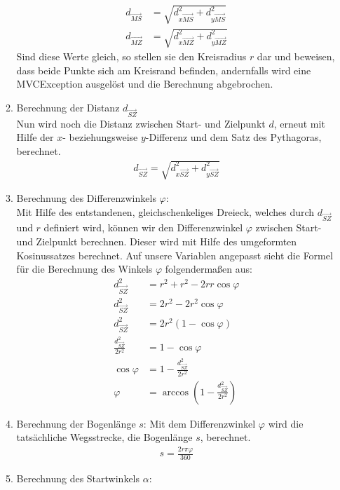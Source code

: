 \begin{itemize}
\begin{enumerate}
\begin{align*}
d_{\overrightarrow{MS}} & = \sqrt{d_{x\overrightarrow{MS}}^2 + d_{y\overrightarrow{MS}}^2}\\
d_{\overrightarrow{MZ}} & = \sqrt{d_{x\overrightarrow{MZ}}^2 + d_{y\overrightarrow{MZ}}^2}
\end{align*}
Sind diese Werte gleich, so stellen sie den Kreisradius $r$ dar und beweisen, dass beide Punkte sich am Kreisrand befinden, andernfalls wird eine MVCException ausgelöst und die Berechnung abgebrochen. 
\item Berechnung der Distanz $d_{\overrightarrow{SZ}}$\\
Nun wird noch die Distanz zwischen Start- und Zielpunkt $d$, erneut mit Hilfe der $x$- beziehungsweise $y$-Differenz und dem Satz des Pythagoras, berechnet.
\begin{align*}
d_{\overrightarrow{SZ}} = \sqrt{d_{x\overrightarrow{SZ}}^2 + d_{y\overrightarrow{SZ}}^2}
\end{align*}
\item Berechnung des Differenzwinkels $\varphi$:\\
Mit Hilfe des entstandenen, gleichschenkeliges Dreieck, welches durch $d_{\overrightarrow{SZ}}$ und $r$ definiert wird, können wir den Differenzwinkel $\varphi$ zwischen Start- und Zielpunkt berechnen. Dieser wird mit Hilfe des umgeformten Kosinussatzes berechnet. Auf unsere Variablen angepasst sieht die Formel für die Berechnung des Winkels $\varphi$ folgendermaßen aus:
\begin{align*}
d_{\overrightarrow{SZ}}^2 & = r^2 + r^2 - 2rr \cos \varphi \\
d_{\overrightarrow{SZ}}^2 & = 2r^2 - 2r^2 \cos \varphi \\
d_{\overrightarrow{SZ}}^2 & = 2r^2(1 - \cos \varphi) \\
\frac{d_{\overrightarrow{SZ}}^2}{2r^2} & = 1 - \cos \varphi \\
\cos \varphi & = 1 - \frac{d_{\overrightarrow{SZ}}^2}{2r^2} \\
\varphi & = \arccos (1 - \frac{d_{\overrightarrow{SZ}}^2}{2r^2})
\end{align*}
\item Berechnung der Bogenlänge $s$:
Mit dem Differenzwinkel $\varphi$ wird die tatsächliche Wegsstrecke, die Bogenlänge $s$, berechnet.
\begin{align*}
s = \frac{2r \pi \varphi}{360}
\end{align*}
\item Berechnung des Startwinkels $\alpha$:\\

\end{enumerate}
\end{itemize}
